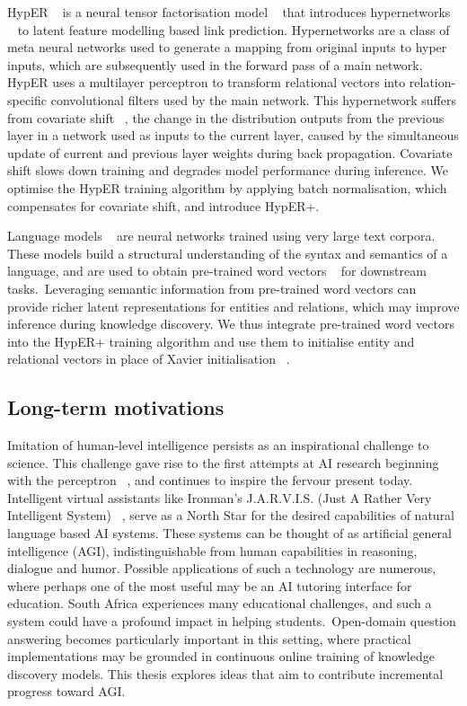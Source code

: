 \noindent HypER \unskip~\citep{balazevic2019hypernetwork} is a neural tensor factorisation model \unskip~\citep{wu2018neural} that introduces hypernetworks \unskip~\citep{ha2016hypernetworks} to latent feature modelling based link prediction. Hypernetworks are a class of meta neural networks used to generate a mapping from original inputs to hyper inputs, which are subsequently used in the forward pass of a main network. HypER uses a multilayer perceptron to transform relational vectors into relation-specific convolutional filters used by the main network. This hypernetwork suffers from covariate shift \unskip~\citep{ioffe2015batch}, the change in the distribution outputs from the previous layer in a network used as inputs to the current layer, caused by the simultaneous update of current and previous layer weights during back propagation. Covariate shift slows down training and degrades model performance during inference. We optimise the HypER training algorithm by applying batch normalisation, which compensates for covariate shift, and introduce HypER+. \par

\noindent Language models \unskip~\citep{turian2010word} are neural networks trained using very large text corpora. These models build a structural understanding of the syntax and semantics of a language, and are used to obtain pre-trained word vectors \unskip~\citep{mikolov2013distributed} for downstream tasks.\ Leveraging semantic information from pre-trained word vectors can provide richer latent representations for entities and relations, which may improve inference during knowledge discovery. We thus integrate pre-trained word vectors into the HypER+ training algorithm and use them to initialise entity and relational vectors in place of Xavier initialisation \unskip~\citep{glorot2010understanding}. 

\subsection{Long-term motivations} 

Imitation of human-level intelligence persists as an inspirational challenge to science. This challenge gave rise to the first attempts at AI research beginning with the perceptron \unskip~\citep{rosenblatt1958perceptron}, and continues to inspire the fervour present today. Intelligent virtual assistants like Ironman's J.A.R.V.I.S. (Just A Rather Very Intelligent System) \unskip~\citep{jarvisIronmanWiki}, serve as a North Star for the desired capabilities of natural language based AI systems. These systems can be thought of as artificial general intelligence (AGI), indistinguishable from human capabilities in reasoning, dialogue and humor. Possible applications of such a technology are numerous, where perhaps one of the most useful may be an AI tutoring interface for education. South Africa experiences many educational challenges, and such a system could have a profound impact in helping students.\ Open-domain question answering becomes particularly important in this setting, where practical implementations may be grounded in continuous online training of knowledge discovery models. This thesis explores ideas that aim to contribute incremental progress toward AGI.  

